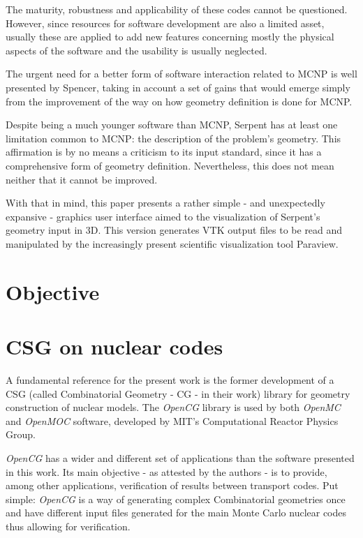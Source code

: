 \documentclass{elsarticle}
\begin{document}
The maturity, robustness and applicability of these codes cannot be questioned.
However, since resources for software development are also a limited asset,
usually these are applied to add new features concerning mostly the physical aspects of the software and the usability is usually neglected.

The urgent need for a better form of software interaction related to MCNP
is well presented by Spencer\cite{Spencer2017}, taking in account a set of gains that would emerge simply from the improvement of the way on how geometry definition is done for MCNP.

Despite being a much younger software than MCNP, Serpent has at least one limitation common to MCNP: the description of the problem's geometry. This affirmation is by no means a criticism to its input standard, since it has a comprehensive form of geometry
definition. Nevertheless, this does not mean neither that it cannot be improved.

With that in mind, this paper presents a rather simple - and unexpectedly expansive -
graphics user interface aimed to the visualization of Serpent's geometry input
in 3D. This version generates VTK output files to be read and manipulated by
the increasingly present scientific visualization tool Paraview\cite{paraview}.

\section{Objective}


\section{CSG on nuclear codes}

A fundamental reference for the present work is the former development of a CSG
(called Combinatorial Geometry - CG - in their work) library for geometry construction
of nuclear models. The \textit{OpenCG} library \cite{Boyd2015} is used by both
\textit{OpenMC}\cite{Romano2015} and \textit{OpenMOC}\cite{Boyd2014} software, developed by
MIT's Computational Reactor Physics Group.

\textit{OpenCG} has a wider and different set of applications than the
software presented in this work. Its main objective - as attested by the authors -
is to provide, among other applications, verification of results between transport
codes. Put simple: \textit{OpenCG} is a way of generating complex
Combinatorial geometries once and have different input files generated for the main
Monte Carlo nuclear codes thus allowing for verification.
\end{document}
